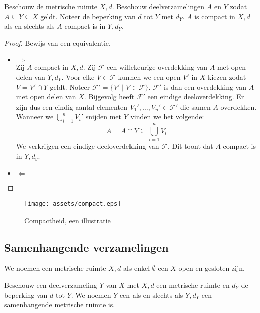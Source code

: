 \documentclass[main.tex]{subfiles}
\begin{document}
\begin{bpr}
  Beschouw de metrische ruimte $X,d$.
  Beschouw deelverzamelingen $A$ en $Y$ zodat $A \subseteq Y \subseteq X$ geldt.
  Noteer de beperking van $d$ tot $Y$ met $d_{Y}$.
  $A$ is compact in $X,d$ als en slechts als $A$ compact is in $Y,d_{Y}$.

  \begin{proof}
    Bewijs van een equivalentie.
    \begin{itemize}
    \item $\Rightarrow$\\
      Zij $A$ compact in $X,d$.
      Zij $\mathcal{F}$ een willekeurige overdekking van $A$ met open delen van $Y,d_{Y}$.
      Voor elke $V\in \mathcal{F}$ kunnen we een open $V'$ in $X$ kiezen zodat $V = V'\cap Y$ geldt.
      Noteer $\mathcal{F}' = \{ V' \mid V \in \mathcal{F}\}$.
      $\mathcal{F}'$ is dan een overdekking van $A$ met open delen van $X$.
      Bijgevolg heeft $\mathcal{F}'$ een eindige deeloverdekking.
      Er zijn dus een eindig aantal elementen $V_{1}',\dotsc,V_{n}' \in \mathcal{F}'$ die samen $A$ overdekken.
      Wanneer we $\bigcup_{i=1}^{n}V_{i}'$ snijden met $Y$ vinden we het volgende:
      \[ A = A \cap Y \subseteq \bigcup_{i=1}^{n}V_{i} \]
      We verkrijgen een eindige deeloverdekking van $\mathcal{F}$.
      Dit toont dat $A$ compact is in $Y,d_{y}$.
    \item $\Leftarrow$\\
    \end{itemize}
  \end{proof}
\end{bpr}

\begin{figure}[H]
  \centering
  \texttt{[image: assets/compact.eps]}
  \caption{Compactheid, een illustratie}
  \label{fig:compactheid}
\end{figure}


\subsection{Samenhangende verzamelingen}
\label{sec:samenh-verz}

\begin{de}
  We noemen een metrische ruimte $X,d$  als enkel $\emptyset$ een $X$ open en gesloten zijn.
\end{de}

\begin{de}
  Beschouw een deelverzameling $Y$ van $X$ met $X,d$ een metrische ruimte en $d_{Y}$ de beperking van $d$ tot $Y$.
  We noemen $Y$ een  als en slechts als $Y,d_{Y}$ een samenhangende metrische ruimte is.
\end{de}
 
\end{document}

